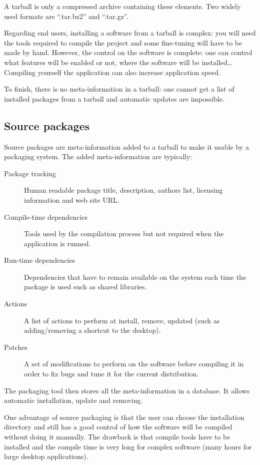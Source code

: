 A tarball is only a compressed archive containing these elements. Two
widely used formats are ``.tar.bz2'' and ``.tar.gz''.



Regarding end users, installing a software from a tarball is complex:
you will need the tools required to compile the project and some
fine-tuning will have to be made by hand. However, the control on the
software is complete: one can control what features will be enabled or
not, where the software will be installed\ldots Compiling yourself the
application can also increase application speed.


To finish, there is no meta-information in a tarball: one cannot get a
list of installed packages from a tarball and automatic updates are
impossible.


\subsection{Source packages}


Source packages are meta-information added to a tarball to make it
usable by a packaging system.
The added meta-information are typically:
\begin{description}
\item[Package tracking] Human readable package title, description,
  authors list, licensing information and web site URL.
\item[Compile-time dependencies] Tools used by the compilation process
  but not required when the application is runned.
\item[Run-time dependencies] Dependencies that have to remain
  available on the system each time the package is used such as shared
  libraries.
\item[Actions] A list of actions to perform at install, remove,
  updated (such as adding/removing a shortcut to the desktop).
\item[Patches] A set of modifications to perform on the software
  before compiling it in order to fix bugs and tune it for the current
  \linux distribution.
\end{description}


The packaging tool then stores all the meta-information in a
database. It allows automatic installation, update and removing.

One advantage of source packaging is that the user can choose the
installation directory and still has a good control of how the
software will be compiled without doing it manually.  The drawback is
that compile tools have to be installed and the compile time is very
long for complex software (many hours for large desktop applications).


